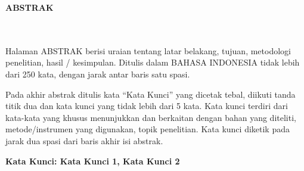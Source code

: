\clearpage
{}%
\thispagestyle{fancy}

\begin{center}
	\large \bfseries \MakeUppercase{Abstrak}\\
	\normalsize \normalfont {\thetitle}\\
	\normalsize \normalfont {\theauthor}\\
	\bigskip
	
	\normalsize \normalfont \justifying \singlespacing
	Halaman ABSTRAK berisi uraian tentang latar belakang, tujuan, metodologi penelitian, hasil / kesimpulan. Ditulis dalam BAHASA INDONESIA tidak lebih dari 250 kata, dengan jarak antar baris satu spasi. \par
	
	Pada akhir abstrak ditulis kata “Kata Kunci” yang dicetak tebal, diikuti tanda titik dua dan kata kunci yang tidak lebih dari 5 kata. Kata kunci terdiri dari kata-kata yang khusus menunjukkan dan berkaitan dengan bahan yang diteliti, metode/instrumen yang digunakan, topik penelitian. Kata kunci diketik pada jarak dua spasi dari baris akhir isi abstrak.\par
	
	\textbf{Kata Kunci: Kata Kunci 1, Kata Kunci 2}
	
	\vfill
	
\end{center}
\clearpage